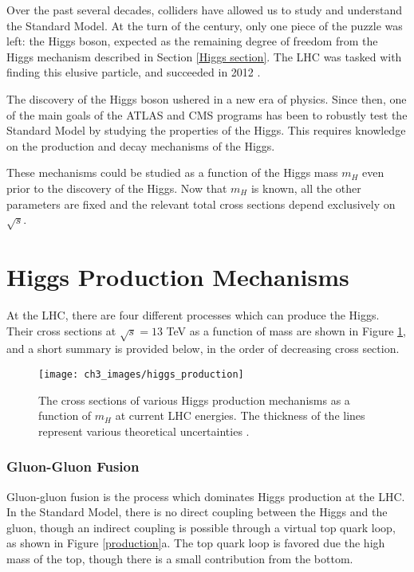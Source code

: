 \documentclass[10pt,a4paper]{book}
\begin{document}
Over the past several decades, colliders have allowed us to study and understand the Standard Model. At the turn of the century, only one piece of the puzzle was left: the Higgs boson, expected as the remaining degree of freedom from the Higgs mechanism described in Section \ref{Higgs section}. The LHC was tasked with finding this elusive particle, and succeeded in 2012 \cite{ATLAS:2012yve, CMS:2012qbp}.

The discovery of the Higgs boson ushered in a new era of physics. Since then, one of the main goals of the ATLAS and CMS programs has been to robustly test the Standard Model by studying the properties of the Higgs. This requires knowledge on the production and decay mechanisms of the Higgs. 

These mechanisms could be studied as a function of the Higgs mass $m_{H}$ even prior to the discovery of the Higgs. Now that $m_{H}$ is known, all the other parameters are fixed and the relevant total cross sections depend exclusively on $\sqrt{s}$. 

\section{Higgs Production Mechanisms}

At the LHC, there are four different processes which can produce the Higgs. Their cross sections at $\sqrt{s} = 13$ TeV as a function of mass are shown in Figure \ref{Higgs production}, and a short summary is provided below, in the order of decreasing cross section.

\begin{figure}
\centering
\texttt{[image: ch3\_images/higgs\_production]}
\caption{The cross sections of various Higgs production mechanisms as a function of $m_H$ at current LHC energies. The thickness of the lines represent various theoretical uncertainties \cite{LHCHiggsCrossSectionWorkingGroup:2016ypw}.}
\label{Higgs production}
\end{figure}

\subsubsection{Gluon-Gluon Fusion}
Gluon-gluon fusion is the process which dominates Higgs production at the LHC.
In the Standard Model, there is no direct coupling between the Higgs and the gluon, though an indirect coupling is possible through a virtual top quark loop, as shown in Figure \ref{production}a. The top quark loop is favored due the high mass of the top, though there is a small contribution from the bottom.
\end{document}

